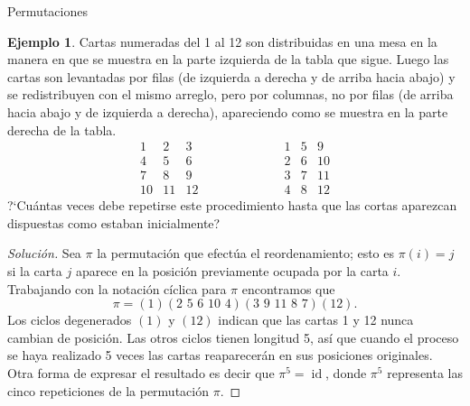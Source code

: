 \documentclass[11pt,spanish,makeidx]{amsbook}
\theoremstyle{definition}
\newtheorem{ejemplo}{Ejemplo}[section]
\theoremstyle{remark}
\begin{document}
\begin{section}{Permutaciones}
\begin{ejemplo}\label{cartas} Cartas numeradas del 1 al 12 son distribuidas en una mesa en la manera en que se muestra en la parte izquierda de la tabla que sigue. Luego las cartas son levantadas  por filas (de izquierda a derecha y de arriba hacia abajo) y se redistribuyen con el mismo arreglo, pero por columnas, no por filas (de arriba hacia abajo y de izquierda a derecha), apareciendo como se muestra en la parte derecha de la tabla.
$$
\begin{matrix} 1& 2& 3\\
4 &5 &6 \\
7 &8 & 9\\
10 &11 & 12 \end{matrix}\qquad \qquad\qquad
\begin{matrix}1 &5 &9 \\
2 &6 &10 \\
3& 7& 11\\
4&8 & 12 \end{matrix}
$$
?`Cuántas veces debe repetirse este procedimiento hasta que las cortas aparezcan dispuestas como estaban inicialmente?
\end{ejemplo}
\begin{proof}[Solución] Sea $\pi$ la permutación que efectúa el reordenamiento; esto es $\pi(i) =j$ si la carta $j$ aparece en la posición previamente ocupada por la carta $i$. Trabajando con la notación cíclica para $\pi$ encontramos que
$$
\pi=(1)(2\,\,5\,\,6\,\,10\,\,4)(3\,\,9\,\,11\,\,8\,\,7)(12).
$$
Los ciclos degenerados $(1)$ y $(12)$ indican que las cartas 1 y 12 nunca cambian de posición. Las otros ciclos tienen longitud 5, así que cuando el proceso se haya realizado 5 veces las cartas
reaparecerán en sus posiciones originales. Otra forma de expresar el resultado es decir que $\pi^5= \operatorname{id}$, donde $\pi^5$ representa las cinco repeticiones de la permutación $\pi$.
\end{proof}
\end{section}
\end{document}
